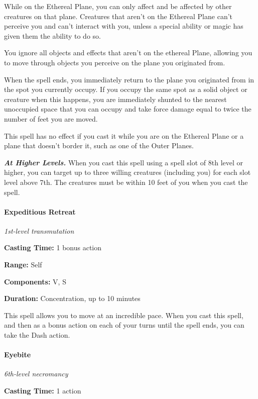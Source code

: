 \documentclass[
]{article}
\begin{document}
While on the Ethereal Plane, you can only affect and be affected by
other creatures on that plane. Creatures that aren't on the Ethereal
Plane can't perceive you and can't interact with you, unless a special
ability or magic has given them the ability to do so.

You ignore all objects and effects that aren't on the ethereal Plane,
allowing you to move through objects you perceive on the plane you
originated from.

When the spell ends, you immediately return to the plane you originated
from in the spot you currently occupy. If you occupy the same spot as a
solid object or creature when this happens, you are immediately shunted
to the nearest unoccupied space that you can occupy and take force
damage equal to twice the number of feet you are moved.

This spell has no effect if you cast it while you are on the Ethereal
Plane or a plane that doesn't border it, such as one of the Outer
Planes.

\emph{\textbf{At Higher Levels.}} When you cast this spell using a spell
slot of 8th level or higher, you can target up to three willing
creatures (including you) for each slot level above 7th. The creatures
must be within 10 feet of you when you cast the spell.

\hypertarget{expeditious-retreat}{%
\paragraph{Expeditious Retreat}\label{expeditious-retreat}}

\emph{1st-level transmutation}

\textbf{Casting Time:} 1 bonus action

\textbf{Range:} Self

\textbf{Components:} V, S

\textbf{Duration:} Concentration, up to 10 minutes

This spell allows you to move at an incredible pace. When you cast this
spell, and then as a bonus action on each of your turns until the spell
ends, you can take the Dash action.

\hypertarget{eyebite}{%
\paragraph{Eyebite}\label{eyebite}}

\emph{6th-level necromancy}

\textbf{Casting Time:} 1 action
\end{document}
